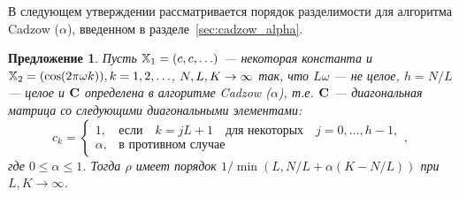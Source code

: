 \documentclass[12pt,a4paper,fleqn,leqno]{article}
\newtheorem{proposition}{Предложение}%
\begin{document}
В следующем утверждении рассматривается порядок разделимости для алгоритма Cadzow ($\alpha$), введенном в разделе~\ref{sec:cadzow_alpha}. 

\begin{proposition}
Пусть $\mathbb{X}_1 = (c, c, \ldots)$ --- некоторая константа и $\mathbb{X}_2 = (\cos(2 \pi \omega k)), k = 1, 2, \ldots$, $N,L,K\rightarrow \infty$ так, что $L\omega$ --- не целое, $h = N/L$ --- целое и $\mathbf{C}$ определена в алгоритме Cadzow ($\alpha$), т.е.  $\mathbf{C}$ --- диагональная матрица со следующими диагональными элементами:
\begin{equation*}
c_k = \begin{cases}
1, & \text{если} \quad k = jL+1 \quad \text{для некоторых} \quad j = 0, \ldots, h-1, \\
\alpha, & \text{в противном случае}
\end{cases},
\end{equation*}
где $0 \le \alpha \le 1$. Тогда $\rho$ имеет порядок $1/\min(L, N/L+\alpha(K - N/L))$ при $L, K \to \infty$.
\end{proposition}
\end{document}
